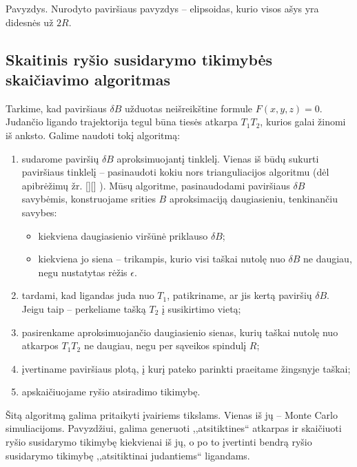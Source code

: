 \documentclass[10pt]{article}
\begin{document}
Pavyzdys. Nurodyto paviršiaus pavyzdys -- elipsoidas, kurio visos ašys yra didesnės už $ 2R $.


 
\subsection{Skaitinis ryšio susidarymo tikimybės skaičiavimo algoritmas}
Tarkime, kad paviršiaus $ \delta B $ užduotas neišreikštine formule $ F(x,y,z) = 0 $. Judančio ligando trajektorija tegul būna tiesės atkarpa $ T_{1}T_{2} $, kurios galai žinomi iš anksto. Galime naudoti tokį  algoritmą:

\begin{enumerate}
\item sudarome paviršių $ \delta B $ aproksimuojantį tinklelį. Vienas iš būdų sukurti paviršiaus tinklelį -- pasinaudoti kokiu nors trianguliacijos algoritmu (dėl apibrėžimų žr. [][] ). Mūsų algoritme, pasinaudodami paviršiaus $ \delta B $ savybėmis, konstruojame   srities $ B $ aproksimaciją daugiasieniu, tenkinančiu savybes:
\begin{itemize}

\item kiekviena daugiasienio viršūnė priklauso $ \delta B $;

\item kiekviena jo siena -- trikampis, kurio visi taškai nutolę nuo $ \delta B $ ne daugiau, negu nustatytas rėžis $ \epsilon $.

\end{itemize}

\item tardami, kad ligandas juda nuo $ T_1 $, patikriname, ar jis kertą paviršių $ \delta B $. Jeigu taip -- perkeliame tašką $ T_2 $ į susikirtimo vietą;

\item pasirenkame aproksimuojančio daugiasienio sienas, kurių taškai nutolę nuo atkarpos $ T_{1}T_{2} $ ne daugiau, negu per sąveikos spindulį $ R $;

\item įvertiname paviršiaus plotą, į kurį pateko parinkti praeitame žingsnyje taškai;

\item apskaičiuojame ryšio atsiradimo tikimybę.
   
\end{enumerate}



Šitą algoritmą galima pritaikyti įvairiems tikslams. Vienas iš jų -- Monte Carlo simuliacijoms. Pavyzdžiui, galima generuoti ,,atsitiktines`` atkarpas ir skaičiuoti ryšio susidarymo tikimybę kiekvienai iš jų, o po to įvertinti bendrą ryšio susidarymo tikimybę ,,atsitiktinai judantiems`` ligandams.
\end{document}
